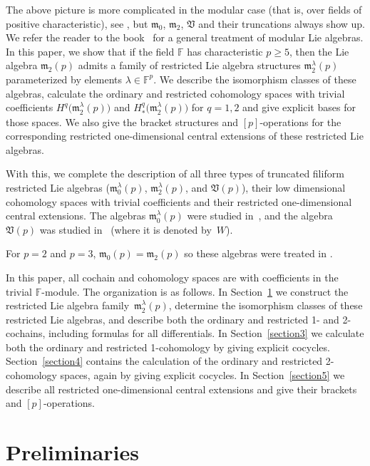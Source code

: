 \documentclass[10pt,a4paper]{amsart}
\def\m{\mathfrak m}
\def\V{\mathfrak V}
\def\F{\mathbb F}
\numberwithin{equation}{section}
\begin{document}
The above picture is more complicated in the modular case (that is,
over fields of positive characteristic), see \cite{CMN1997, CN2000, Jurman2005}, but
$\m_0$, $\m_2$, $\V$ and their truncations always show up. We refer the
reader to the book~\cite{SF} for a general treatment of modular Lie
algebras. In this paper, we show that if the field $\F$ has
characteristic $p\ge 5$, then the Lie algebra $\m_2(p)$ admits a
family of restricted Lie algebra structures $\m_2^{\lambda}(p)$
parameterized by elements $\lambda \in \F^p$. We describe the
isomorphism classes of these algebras, calculate the ordinary and restricted cohomology spaces with trivial coefficients $H^q\big(\m_2^{\lambda}(p)\big)$ and $H_*^q\big(\m_2^{\lambda}(p)\big)$ for $q=1,2$ and give explicit bases for those spaces. We also give the bracket
structures and $[p]$-operations for the corresponding restricted
one-dimensional central extensions of these restricted Lie algebras.

With this, we complete the description of all three types of truncated filiform restricted Lie algebras ($\m_0^\lambda(p)$, $\m_2^\lambda(p)$, and $\V(p)$), their low dimensional cohomology spaces with trivial coefficients and their restricted one-dimensional central extensions. The algebras $\m_0^{\lambda}(p)$ were studied in~\cite{EvFi2019}, and the algebra $\V(p)$ was studied in~\cite{EvFiPe2016} (where it is denoted by~$W$).

\begin{Remark}
 For $p=2$ and $p=3$, $\m_0(p)=\m_2(p)$ so these algebras were
 treated in \cite{EvFi2019}.
\end{Remark}

In this paper, all cochain and cohomology spaces are with coefficients in the trivial $\F$-module. The organization is as follows. In Section~\ref{section2} we construct the restricted Lie algebra family~$\m_2^{\lambda}(p)$, determine the isomorphism classes of these restricted Lie algebras, and describe both the ordinary and restricted 1- and 2-cochains, including formulas for all differentials. In Section~\ref{section3} we calculate both the ordinary and restricted 1-cohomology by giving explicit cocycles. Section~\ref{section4} contains the calculation of the ordinary and restricted 2-cohomology spaces, again by giving explicit cocycles. In Section~\ref{section5} we describe all restricted one-dimensional central extensions and give their brackets and $[p]$-operations.

\section{Preliminaries}\label{section2}
\end{document}
